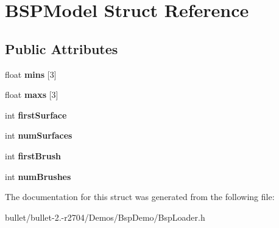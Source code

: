 \hypertarget{struct_b_s_p_model}{\section{B\+S\+P\+Model Struct Reference}
\label{struct_b_s_p_model}
}
\subsection*{Public Attributes}
\begin{DoxyCompactItemize}
\item 
\hypertarget{struct_b_s_p_model_af5601707bc65f87ca6bef877a4b48f7a}{float {\bfseries mins} \mbox{[}3\mbox{]}}\label{struct_b_s_p_model_af5601707bc65f87ca6bef877a4b48f7a}

\item 
\hypertarget{struct_b_s_p_model_a26c0d11b678a93b9fd9f74e2a46ab4b2}{float {\bfseries maxs} \mbox{[}3\mbox{]}}\label{struct_b_s_p_model_a26c0d11b678a93b9fd9f74e2a46ab4b2}

\item 
\hypertarget{struct_b_s_p_model_a83a0c588c1bfa279bd94ac496391fe99}{int {\bfseries first\+Surface}}\label{struct_b_s_p_model_a83a0c588c1bfa279bd94ac496391fe99}

\item 
\hypertarget{struct_b_s_p_model_af20fc55b929c916aef4a1d21f46086f2}{int {\bfseries num\+Surfaces}}\label{struct_b_s_p_model_af20fc55b929c916aef4a1d21f46086f2}

\item 
\hypertarget{struct_b_s_p_model_ab0f67cc879a45353d59fd470b47a7d7e}{int {\bfseries first\+Brush}}\label{struct_b_s_p_model_ab0f67cc879a45353d59fd470b47a7d7e}

\item 
\hypertarget{struct_b_s_p_model_a8faacceac8b8a76aae5ae602f357a95e}{int {\bfseries num\+Brushes}}\label{struct_b_s_p_model_a8faacceac8b8a76aae5ae602f357a95e}

\end{DoxyCompactItemize}


The documentation for this struct was generated from the following file\+:\begin{DoxyCompactItemize}
\item 
bullet/bullet-\/2.-\/r2704/\+Demos/\+Bsp\+Demo/Bsp\+Loader.\+h\end{DoxyCompactItemize}
